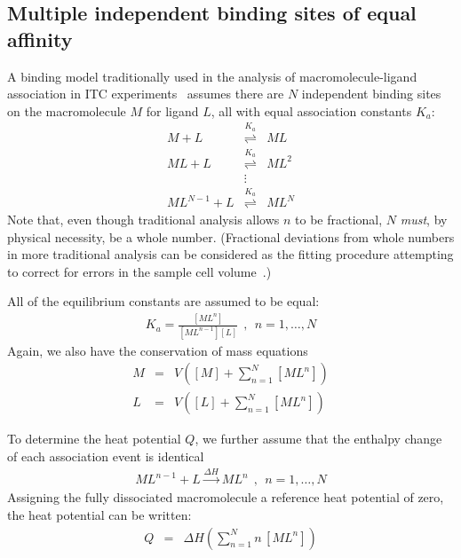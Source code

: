 \documentclass[aps,pre,twocolumn,nofootinbib,superscriptaddress,linenumbers]{revtex4-1}
\begin{document}
\begin{widetext}
\subsection{Multiple independent binding sites of equal affinity}
\label{section:multiple-independent-binding-sites-of-equal-affinity}

A binding model traditionally used in the analysis of macromolecule-ligand association in ITC experiments~\cite{iseman:anal-biochem:1989:itc} assumes there are $N$ independent binding sites on the macromolecule $M$ for ligand $L$, all with equal association constants $K_a$:
\begin{eqnarray}
M + L &\overset{K_a}{\rightleftharpoons}& ML \nonumber \\
ML + L &\overset{K_a}{\rightleftharpoons}& ML^2 \nonumber \\
&\vdots& \nonumber \\
ML^{N-1} + L &\overset{K_a}{\rightleftharpoons}& ML^N
\end{eqnarray}
Note that, even though traditional analysis allows $n$ to be fractional, $N$ \emph{must}, by physical necessity, be a whole number.
(Fractional deviations from whole numbers in more traditional analysis can be considered as the fitting procedure attempting to correct for errors in the sample cell volume~\cite{tellinghuisen:anal-biochem:2004:volume-errors-in-itc}.)

All of the equilibrium constants are assumed to be equal:
\begin{eqnarray}
K_a = \frac{[ML^n]}{[ML^{n-1}][L]} \:\:,\:\: n = 1, \ldots, N
\end{eqnarray}
Again, we also have the conservation of mass equations
\begin{eqnarray}
M &=& V ([M] + \sum_{n=1}^N [ML^n]) \nonumber \\
L &=& V ([L] + \sum_{n=1}^N [ML^n]) 
\end{eqnarray}

To determine the heat potential $Q$, we further assume that the enthalpy change of each association event is identical
\begin{eqnarray}
ML^{n-1} + L \overset{\Delta H}{\rightarrow} ML^n \:\:,\:\: n = 1, \ldots, N
\end{eqnarray}
Assigning the fully dissociated macromolecule a reference heat potential of zero, the heat potential can be written:
\begin{eqnarray}
Q &=& \Delta H (\sum_{n=1}^N n \, [ML^n])
\end{eqnarray}


\end{widetext}
\end{document}
